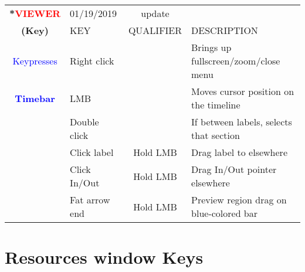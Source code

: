 \begin{center}
    \small 
    \begin{longtable}{ >{\bfseries}c l c p{6cm}}             
        \toprule
        \multirow{2}*{\textcolor{red}{VIEWER}} & 01/19/2019 & update & \\
        \noalign{\smallskip}
        \cline{2-4}
        \noalign{\smallskip}
        (Key) & KEY & QUALIFIER & DESCRIPTION\\
        \midrule        
        \endhead   
        
        \textcolor{blue}{Keypresses} & Right click &  & Brings up fullscreen/zoom/close menu \\
        \midrule        
        \textcolor{blue}{Timebar} & LMB &  & Moves cursor position on the timeline \\        
        & Double click &  & If between labels, selects that section \\        
        & Click label & Hold LMB & Drag label to elsewhere \\        
        & Click In/Out & Hold LMB & Drag In/Out pointer elsewhere \\        
        & Fat arrow end & Hold LMB & Preview region drag on blue-colored bar \\        
        
        \bottomrule  
    \end{longtable}
\end{center} 

\section{Resources window Keys }%
\label{sec:resources_window_keys}

